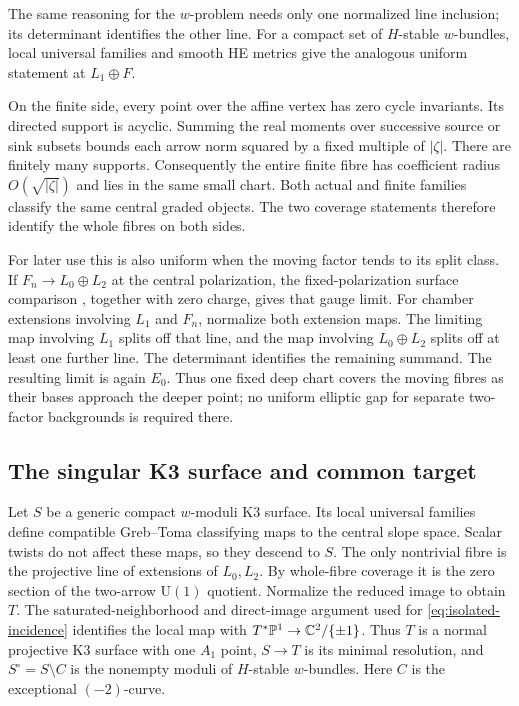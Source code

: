 The same reasoning for the $w$-problem needs only
one normalized line inclusion; its determinant
identifies the other line. For a compact set of
$H$-stable $w$-bundles, local universal families
and smooth HE metrics give the analogous uniform
statement at $L_1\oplus F$.

On the finite side, every point over the affine
vertex has zero cycle invariants. Its directed
support is acyclic. Summing the real moments over
successive source or sink subsets bounds each
arrow norm squared by a fixed multiple of
$|\zeta|$. There are finitely many supports.
Consequently the entire finite fibre has
coefficient radius $O(\sqrt{|\zeta|})$ and lies
in the same small chart. Both actual and finite
families classify the same central graded
objects. The two coverage statements therefore
identify the whole fibres on both sides.

For later use this is also uniform when the
moving factor tends to its split class. If
$F_n\to L_0\oplus L_2$ at the central polarization,
the fixed-polarization surface comparison
\cite[Theorem~4.11 and Corollary~4.15]{gstw},
together with zero charge, gives that gauge
limit. For chamber extensions involving $L_1$
and $F_n$, normalize both extension maps.
The limiting map involving $L_1$ splits off
that line, and the map involving $L_0\oplus L_2$
splits off at least one further line. The
determinant identifies the remaining summand.
The resulting limit is again $E_0$. Thus one
fixed deep chart covers the moving fibres as
their bases approach the deeper point; no
uniform elliptic gap for separate two-factor
backgrounds is required there.

\subsection{The singular K3 surface and common target}
Let $S$ be a generic compact $w$-moduli K3 surface.
Its local universal families define compatible
Greb--Toma classifying maps to the central slope
space. Scalar twists do not affect these maps,
so they descend to $S$. The only nontrivial
fibre is the projective line of extensions of
$L_0,L_2$. By whole-fibre coverage it is the
zero section of the two-arrow $\mathrm U(1)$
quotient. Normalize the reduced image to obtain
$T$. The saturated-neighborhood and
direct-image argument used for
\eqref{eq:isolated-incidence} identifies the
local map with $T^*\mathbb P^1\to\mathbb C^2/\{\pm1\}$.
Thus $T$ is a normal projective K3 surface
with one $A_1$ point, $S\to T$ is its minimal
resolution, and $S^\circ=S\setminus C$ is
the nonempty moduli of $H$-stable $w$-bundles.
Here $C$ is the exceptional $(-2)$-curve.


